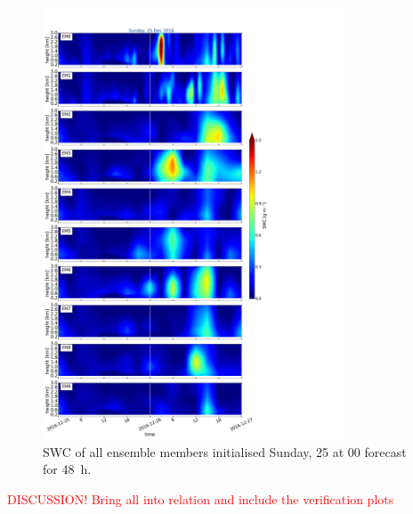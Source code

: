 \begin{figure}[t]
	\centering
	\includegraphics[trim={0cm 0cm 18.3cm 5.1cm},clip,width=0.8\textwidth]{./fig_09EM/20161225}
	\caption{SWC of all ensemble members initialised Sunday, \SI{25}{\dec} at 0\SI{0}{\UTC} forecast for \SI{48}{\hour}.}\label{fig:EM09_25}
\end{figure}
\textcolor{red}{DISCUSSION! Bring all into relation and include the verification plots}
